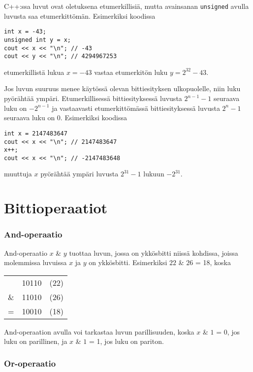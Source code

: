 C++:ssa luvut ovat oletuksena etumerkillisiä,
mutta avainsanan \texttt{unsigned} avulla
luvusta saa etumerkittömän.
Esimerkiksi koodissa
\begin{lstlisting}
int x = -43;
unsigned int y = x;
cout << x << "\n"; // -43
cout << y << "\n"; // 4294967253
\end{lstlisting}
etumerkillistä lukua $x=-43$ vastaa etumerkitön luku $y=2^{32}-43$.

Jos luvun suuruus menee käytössä
olevan bittiesityksen ulkopuolelle,
niin luku pyörähtää ympäri.
Etumerkillisessä bittiesityksessä
luvusta $2^{n-1}-1$ seuraava luku on $-2^{n-1}$
ja vastaavasti etumerkittömässä bittiesityksessä
luvusta $2^n-1$ seuraava luku on $0$.
Esimerkiksi koodissa
\begin{lstlisting}
int x = 2147483647
cout << x << "\n"; // 2147483647
x++;
cout << x << "\n"; // -2147483648
\end{lstlisting}
muuttuja $x$ pyörähtää ympäri luvusta $2^{31}-1$ lukuun $-2^{31}$.

\section{Bittioperaatiot}

\newcommand\XOR{\mathbin{\char`\^}}

\subsubsection{And-operaatio}


And-operaatio $x$ \& $y$ tuottaa luvun,
jossa on ykkösbitti niissä kohdissa,
joissa molemmissa luvuissa $x$ ja $y$ on ykkösbitti.
Esimerkiksi $22$ \& $26$ = 18, koska

\begin{center}
\begin{tabular}{rrr}
& 10110 & (22)\\
\& & 11010 & (26) \\
\hline
 = & 10010 & (18) \\
\end{tabular}
\end{center}

And-operaation avulla voi tarkastaa luvun parillisuuden,
koska $x$ \& $1$ = 0, jos luku on parillinen,
ja $x$ \& $1$ = 1, jos luku on pariton.

\subsubsection{Or-operaatio}


